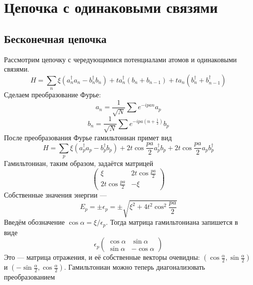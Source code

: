 \section{Цепочка с одинаковыми связями}
\subsection{Бесконечная цепочка}
Рассмотрим цепочку с чередующимися потенциалами атомов и одинаковыми связями.
\begin{equation}
	H = \sum_n \xi(a_n^\dagger a_n - b_n^\dagger b_n) + ta_n^\dagger(b_n + b_{n-1}) +
			ta_n(b_n^\dagger + b_{n-1}^\dagger)
\end{equation}
Сделаем преобразование Фурье:
\begin{equation}
	a_n = \frac{1}{\sqrt{N}} \sum e^{-ipan} a_p
\end{equation}
\begin{equation}
	b_n = \frac{1}{\sqrt{N}} \sum e^{-ipa(n+\frac{1}{2})} b_p
\end{equation}
После преобразования Фурье гамильтониан примет вид
\begin{equation}
	H = \sum_p \xi (a_p^\dagger a_p - b_p^\dagger b_p) + 2t\cos{\frac{pa}{2}} a_p^\dagger b_p
			+ 2t\cos{\frac{pa}{2}}a_pb_p^\dagger
\end{equation}
Гамильтониан, таким образом, задаётся матрицей
\begin{equation}
	\left(\begin{matrix}
		\xi & 2t\cos{\frac{pa}{2}} \\
		2t\cos{\frac{pa}{2}} & -\xi
	\end{matrix}\right)
\end{equation}
Собственные значения энергии ---
\begin{equation}
	E_p = \pm \epsilon_p = \pm \sqrt{\xi^2 + 4t^2 \cos^2{\frac{pa}{2}}}
\end{equation}
Введём обозначение $\cos\alpha = \xi/\epsilon_p$. Тогда матрица гамильтониана запишется 
в виде
\begin{equation}
	\epsilon_p \left(
		\begin{matrix}
			\cos{\alpha} & \sin{\alpha} \\
			\sin{\alpha} & -\cos{\alpha} 
		\end{matrix}
		\right)
\end{equation}
Это --- матрица отражения, и её собственные векторы очевидны: 
$(\cos{\frac{\alpha}{2}}, \sin{\frac{\alpha}{2}})$ и 
$(-\sin{\frac{\alpha}{2}}, \cos{\frac{\alpha}{2}})$.
Гамильтониан можно теперь диагонализовать преобразованием
